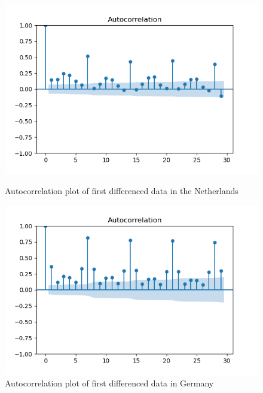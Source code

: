 \begin{figure}
\begin{minipage}{.5\textwidth}
    \centering
    \includegraphics[width=\linewidth]{pics/acf_1_diff_NL.png}
    \caption{Autocorrelation plot of first differenced data in the Netherlands}
    \label{fig:autocorrelation NL}
\end{minipage}
\begin{minipage}{.5\textwidth} 
    \centering
    \includegraphics[width=\linewidth]{pics/acf_1_diff_DE.png}
    \caption{Autocorrelation plot of first differenced data in Germany}
    \label{fig:autocorrelation DE}
\end{minipage}
\end{figure}
